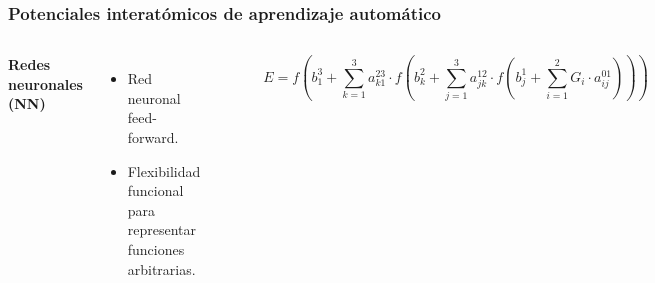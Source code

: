 \documentclass[aspectratio=169]{beamer}
\let\oldtextbf\textbf
\renewcommand{\textbf}[1]{\textcolor{nordblue}{\oldtextbf{#1}}}
\begin{document}
    \begin{frame}
        \frametitle{Potenciales interatómicos de aprendizaje automático}

        \begin{columns}
            \textbf{Redes neuronales (NN)}
            \begin{itemize}
                \item Red neuronal feed-forward.
                \item Flexibilidad funcional para representar funciones
                    arbitrarias.
            \end{itemize}

            \begin{center}
                \includegraphics[width=\columnwidth]{MLP-NN.png}
            \end{center}

            \pause
        
            \begin{center}
                \includegraphics[width=0.4\columnwidth]{MLP-NN-node.png}
            \end{center}
            $$
            E = f\left(
                b_1^3 + \sum_{k=1}^3 a_{k1}^{23} \cdot f\left(
                    b_k^2 + \sum_{j=1}^3 a_{jk}^{12} \cdot f\left(
                        b_j^1 + \sum_{i=1}^2 G_i \cdot a_{ij}^{01}
                    \right)
                \right)
            \right)
            $$

        \end{columns}

    \end{frame}
    
\end{document}
